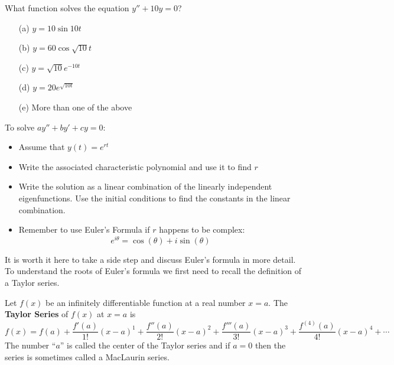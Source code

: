 \begin{problem}
    What function solves the equation $y'' + 10 y =0$?
\begin{enumerate}
    \item[(a)] $y = 10 \sin 10 t$
    \item[(b)] $y = 60 \cos \sqrt{10} t$
    \item[(c)] $y = \sqrt{10} e^{-10 t}$
    \item[(d)] $y = 20 e^{\sqrt{10 t}}$
    \item[(e)] More than one of the above
\end{enumerate}
\end{problem}
%             

\begin{technique}\label{tech:second_order_ode}
    To solve $a y'' + by' + c y = 0$:
    \begin{itemize}
        \item Assume that $y(t) = e^{rt}$
        \item Write the associated characteristic polynomial and use it to find $r$
        \item Write the solution as a linear combination of the linearly independent
            eigenfunctions.  Use the initial conditions to find the constants in the
            linear combination.
        \item Remember to use Euler's Formula if $r$ happens to be complex: 
            \[ e^{i\theta} =\cos(\theta) + i\sin(\theta) \]
    \end{itemize}
\end{technique}


It is worth it here to take a side step and discuss Euler's formula in more detail.  To
understand the roots of Euler's formula we first need to recall the definition of a Taylor
series.
\begin{definition}
    Let $f(x)$ be an infinitely differentiable function at a real number $x=a$.  The {\bf
    Taylor Series} of $f(x)$ at $x=a$ is
    \[ f(x) = f(a) + \frac{f'(a)}{1!}(x-a)^1 + \frac{f''(a)}{2!}(x-a)^2
        +\frac{f'''(a)}{3!}(x-a)^3 +\frac{f^{(4)}(a)}{4!}(x-a)^4 + \cdots \]
    The number ``$a$'' is called the center of the Taylor series and if $a=0$ then the
    series is sometimes called a MacLaurin series.
\end{definition}

